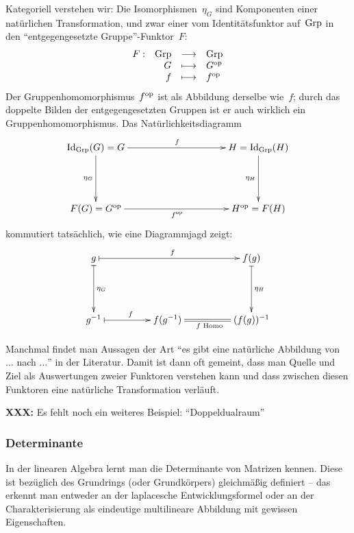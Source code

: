 Kategoriell verstehen wir: Die Isomorphismen~$\eta_G$ sind Komponenten einer
natürlichen Transformation, und zwar einer vom Identitätsfunktor auf~$\mathrm{Grp}$ in
den "`entgegengesetzte Gruppe"'-Funktor~$F$:
\[ \begin{array}{@{}rrcl@{}}
  F : & \Grp &\longrightarrow& \Grp \\
  & G &\longmapsto& G^\op \\
  & f &\longmapsto& f^\op
\end{array} \]
Der Gruppenhomomorphismus~$f^{\mathrm{op}}$ ist als Abbildung derselbe wie~$f$; durch das
doppelte Bilden der entgegengesetzten Gruppen ist er auch wirklich ein
Gruppenhomomorphismus. Das Natürlichkeitsdiagramm
\[ \xymatrixcolsep{4pc}\xymatrixrowsep{4pc}\xymatrix{
  \Id_\Grp(G)=G \ar[rr]^{f} \ar[d]_{\eta_G} && H=\Id_\Grp(H) \ar[d]_{\eta_H} \\
  F(G)=G^\op \ar[rr]_{f^\op} && H^\op=F(H)
} \]
kommutiert tatsächlich, wie eine Diagrammjagd zeigt:
\[ \xymatrixcolsep{4pc}\xymatrixrowsep{4pc}\xymatrix{
  g \ar@{|->}^f[rr] \ar@{|->}^{\eta_G}[d] & & f(g) \ar@{|->}^{\eta_H}[d] \\
  g^{-1} \ar@{|->}^f[r]  & f(g^{-1}) \ar@{=}_{\text{$f$ Homo}}[r] & (f(g))^{-1}
} \]


\begin{bem}\label{interpretnat}%
Manchmal findet man Aussagen der Art "`es gibt eine natürliche Abbildung
von $\ldots$ nach $\ldots$"' in der Literatur. Damit ist dann oft gemeint, dass
man Quelle und Ziel als Auswertungen zweier Funktoren verstehen kann und dass
zwischen diesen Funktoren eine natürliche Transformation verläuft.\end{bem}

\textbf{XXX:} Es fehlt noch ein weiteres Beispiel:
"`Doppeldualraum"'


\subsubsection*{Determinante}

In der linearen Algebra lernt man die Determinante von Matrizen kennen. Diese
ist bezüglich des Grundrings (oder Grundkörpers) gleichmäßig definiert -- das
erkennt man entweder an der laplacesche Entwicklungsformel oder an der
Charakterisierung als eindeutige multilineare Abbildung mit gewissen
Eigenschaften.

